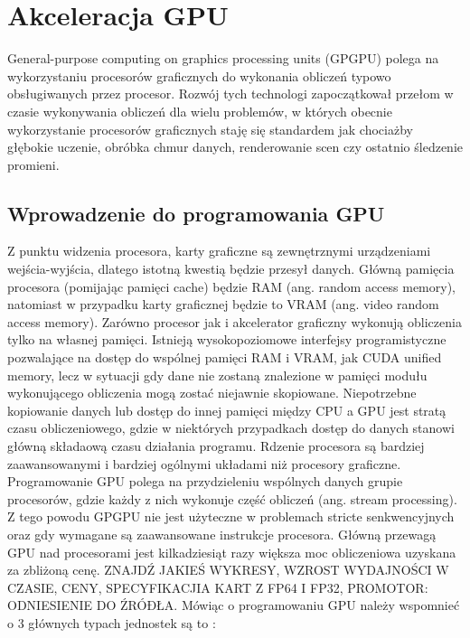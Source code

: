 \section{Akceleracja GPU}
\label{sec:akceleracja}
General-purpose computing on graphics processing units (GPGPU) polega na wykorzystaniu procesorów graficznych do wykonania obliczeń typowo obsługiwanych przez procesor. Rozwój tych technologi zapoczątkował przełom w czasie wykonywania obliczeń dla wielu problemów, w których obecnie wykorzystanie procesorów graficznych staję się standardem jak chociażby głębokie uczenie, obróbka chmur danych, renderowanie scen czy ostatnio śledzenie promieni.

\subsection{Wprowadzenie do programowania GPU}
Z punktu widzenia procesora, karty graficzne są zewnętrznymi urządzeniami wejścia-wyjścia, dlatego istotną kwestią będzie przesył danych. Główną pamięcia procesora (pomijając pamięci cache) będzie RAM (ang. random access memory), natomiast w przypadku karty graficznej będzie to VRAM (ang. video random access memory). Zarówno procesor jak i akcelerator graficzny wykonują obliczenia tylko na własnej pamięci. Istnieją wysokopoziomowe interfejsy programistyczne pozwalające na dostęp do wspólnej pamięci RAM i VRAM, jak CUDA unified memory, lecz w sytuacji gdy dane nie zostaną znalezione w pamięci modułu wykonującego obliczenia mogą zostać niejawnie skopiowane. Niepotrzebne kopiowanie danych lub dostęp do innej pamięci między CPU a GPU jest stratą czasu obliczeniowego, gdzie w niektórych przypadkach dostęp do danych stanowi główną składaową czasu działania programu. Rdzenie procesora są bardziej zaawansowanymi i bardziej ogólnymi układami niż procesory graficzne. Programowanie GPU polega na przydzieleniu wspólnych danych grupie procesorów, gdzie każdy z nich wykonuje część obliczeń (ang. stream processing). Z tego powodu GPGPU nie jest użyteczne w problemach stricte senkwencyjnych oraz gdy wymagane są zaawansowane instrukcje procesora. Główną przewagą GPU nad procesorami jest kilkadziesiąt razy większa moc obliczeniowa uzyskana za zbliżoną cenę. ZNAJDŹ JAKIEŚ WYKRESY, WZROST WYDAJNOŚCI W CZASIE, CENY, SPECYFIKACJIA KART Z FP64 I FP32, PROMOTOR: ODNIESIENIE DO ŹRÓÐŁA. Mówiąc o programowaniu GPU należy wspomnieć o 3 głównych typach jednostek są to :
